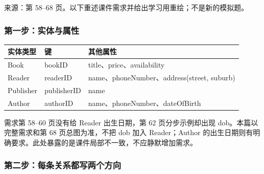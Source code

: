来源：第 58--68 页。以下重述课件需求并给出学习用重绘；不是新的模拟题。

\subsubsection{第一步：实体与属性}\label{02_er_modelling_zh-ux7b2cux4e00ux6b65ux5b9eux4f53ux4e0eux5c5eux6027}

\begin{longtable}[]{@{}lll@{}}
\toprule\noalign{}
实体类型 & 键 & 其他属性 \\
\midrule\noalign{}
\endhead
\bottomrule\noalign{}
\endlastfoot
Book & bookID & title、price、availability \\
Reader & readerID & name、phoneNumber、address(street, suburb) \\
Publisher & publisherID & name \\
Author & authorID & name、phoneNumber、dateOfBirth \\
\end{longtable}

需求第 58--60 页没有给 Reader 出生日期，第 62 页分步示例却出现 dob。本篇以完整需求和第 68 页总图为准，不把 dob 加入 Reader；Author 的出生日期则有明确要求。此处暴露的是课件局部不一致，不应静默增加需求。

\subsubsection{第二步：每条关系都写两个方向}\label{02_er_modelling_zh-ux7b2cux4e8cux6b65ux6bcfux6761ux5173ux7cfbux90fdux5199ux4e24ux4e2aux65b9ux5411}

